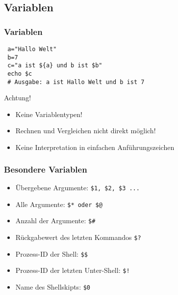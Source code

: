 \documentclass{beamer}
\begin{document}
\subsection{Variablen}
\begin{frame}[fragile]
 \frametitle{Variablen}
 
 \begin{lstlisting}
 a="Hallo Welt"
 b=7
 c="a ist ${a} und b ist $b"
 echo $c
 # Ausgabe: a ist Hallo Welt und b ist 7
 \end{lstlisting}
 
 \begin{alertblock}{Achtung!}
  \begin{itemize}
   \item Keine Variablentypen!
   \item Rechnen und Vergleichen nicht direkt möglich!
   \item Keine Interpretation in einfachen Anführungszeichen
  \end{itemize}
 \end{alertblock}
\end{frame}

\begin{frame}[<+->]
 \frametitle{Besondere Variablen}
 
 \begin{itemize}
  \item Übergebene Argumente: \tt\$1, \$2, \$3 ...
  \item Alle Argumente: \tt\$* oder \$@
  \item Anzahl der Argumente: \tt\$\#
  \item Rückgabewert des letzten Kommandos \tt\$?
  \item Prozess-ID der Shell: \tt\$\$
  \item Prozess-ID der letzten Unter-Shell: \tt\$!
  \item Name des Shellskipts: \tt\$0
 \end{itemize}
\end{frame}
\end{document}
